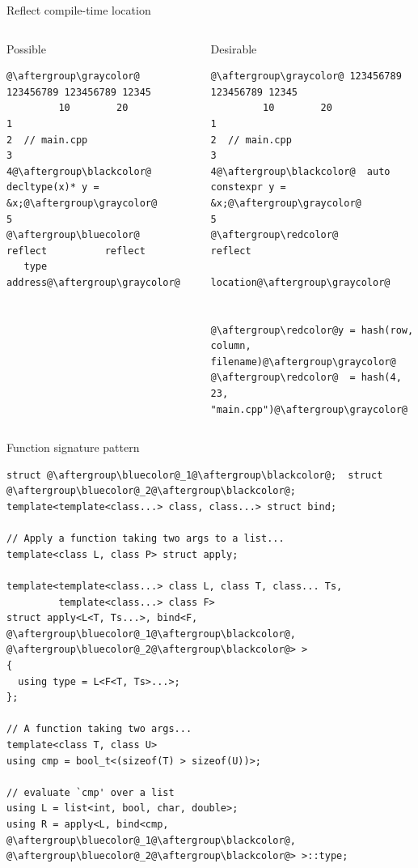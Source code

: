\documentclass[xcolor=dvipsnames]{beamer}
\begin{document}
\begin{frame}[fragile]{Reflect compile-time location}
  \begin{columns}[T] %
    \begin{column}{0.47\textwidth}
\begin{center}Possible\end{center}
  \begin{lstlisting}
@\aftergroup\graycolor@ 123456789 123456789 12345
         10        20
1
2  // main.cpp
3
4@\aftergroup\blackcolor@  decltype(x)* y = &x;@\aftergroup\graycolor@
5
@\aftergroup\bluecolor@   reflect          reflect
   type             address@\aftergroup\graycolor@
  \end{lstlisting}
    \end{column}%
    \hfill%
    \begin{column}{0.53\textwidth}
\begin{center}Desirable\end{center}
 \begin{lstlisting}
@\aftergroup\graycolor@ 123456789 123456789 12345
         10        20
1
2  // main.cpp
3
4@\aftergroup\blackcolor@  auto constexpr y = &x;@\aftergroup\graycolor@
5
@\aftergroup\redcolor@                      reflect
                      location@\aftergroup\graycolor@


@\aftergroup\redcolor@y = hash(row, column, filename)@\aftergroup\graycolor@
@\aftergroup\redcolor@  = hash(4, 23, "main.cpp")@\aftergroup\graycolor@

 \end{lstlisting}
    \end{column}%
  \end{columns}
\end{frame}


\begin{frame}[fragile]{Function signature pattern}
\begin{lstlisting}
struct @\aftergroup\bluecolor@_1@\aftergroup\blackcolor@;  struct @\aftergroup\bluecolor@_2@\aftergroup\blackcolor@;
template<template<class...> class, class...> struct bind;

// Apply a function taking two args to a list...
template<class L, class P> struct apply;

template<template<class...> class L, class T, class... Ts,
         template<class...> class F>
struct apply<L<T, Ts...>, bind<F, @\aftergroup\bluecolor@_1@\aftergroup\blackcolor@, @\aftergroup\bluecolor@_2@\aftergroup\blackcolor@> >
{
  using type = L<F<T, Ts>...>;
};

// A function taking two args...
template<class T, class U>
using cmp = bool_t<(sizeof(T) > sizeof(U))>;

// evaluate `cmp' over a list
using L = list<int, bool, char, double>;
using R = apply<L, bind<cmp, @\aftergroup\bluecolor@_1@\aftergroup\blackcolor@, @\aftergroup\bluecolor@_2@\aftergroup\blackcolor@> >::type;
\end{lstlisting}
\end{frame}
\end{document}
